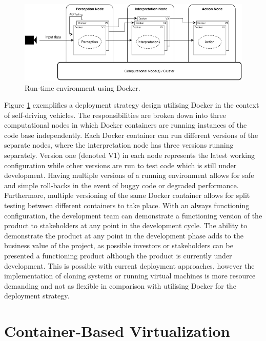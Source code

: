 \begin{figure}[ht]
\centering
     \includegraphics[width=1.0\textwidth]{./figure/containers.png}
      \caption{Run-time environment using Docker.}
       \label{containers}
\end{figure}

Figure \ref{containers} exemplifies a deployment strategy design utilising Docker in the context of self-driving vehicles. The responsibilities are broken down into three computational nodes in which Docker containers are running instances of the code base independently. Each Docker container can run different versions of the separate nodes, where the interpretation node has three versions running separately. Version one (denoted V1) in each node represents the latest working configuration while other versions are run to test code which is still under development. Having multiple versions of a running environment allows for safe and simple roll-backs in the event of buggy code or degraded performance. Furthermore, multiple versioning of the same Docker container allows for split testing between different containers to take place. With an always functioning configuration, the development team can demonstrate a functioning version of the product to stakeholders at any point in the development cycle. The ability to demonstrate the product at any point in the development phase adds to the business value of the project, as possible investors or stakeholders can be presented a functioning product although the product is currently under development. This is possible with current deployment approaches, however the implementation of cloning systems or running virtual machines is more resource demanding \cite{vmvscontainers} and not as flexible in comparison with utilising Docker for the deployment strategy.


\section{Container-Based Virtualization}

